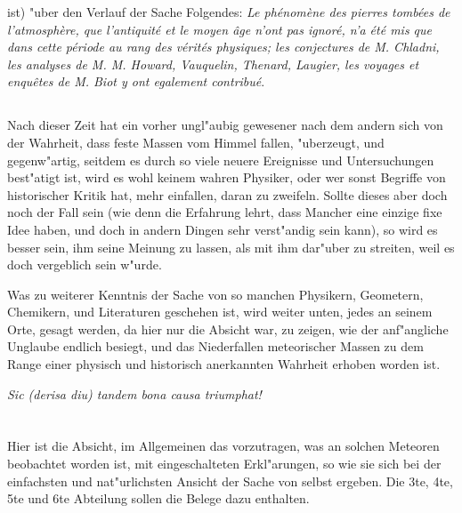 \documentclass[a4paper, 11pt, oneside, polutonikogreek, german]{article}
\begin{document}
ist) "uber den Verlauf der Sache Folgendes: \emph{Le phénomène des pierres tombées de l'atmosphère, que l'antiquité et le moyen âge n'ont pas ignoré, n'a été mis que dans cette période au rang des vérités physiques; les conjectures de M. Chladni, les analyses de M. M. Howard, Vauquelin, Thenard, Laugier, les voyages et enquêtes de M. Biot y ont egalement contribué}.
\subsection{}
\paragraph{}
Nach dieser Zeit hat ein vorher ungl"aubig gewesener nach dem andern sich von der Wahrheit, dass feste Massen vom Himmel fallen, "uberzeugt, und gegenw"artig, seitdem es durch so viele neuere Ereignisse und Untersuchungen best"atigt ist, wird es wohl keinem wahren Physiker, oder wer sonst Begriffe von historischer Kritik hat, mehr einfallen, daran zu zweifeln. Sollte dieses aber doch noch der Fall sein (wie denn die  Erfahrung lehrt, dass Mancher eine einzige fixe Idee haben, und doch in andern Dingen sehr verst"andig sein kann), so wird es besser sein, ihm seine Meinung zu lassen, als mit ihm dar"uber zu streiten, weil es doch vergeblich sein w"urde.

Was zu weiterer Kenntnis der Sache von so manchen Physikern, Geometern, Chemikern, und Literaturen geschehen ist, wird weiter unten, jedes an seinem Orte, gesagt werden, da hier nur die Absicht war, zu zeigen, wie der anf"angliche Unglaube endlich besiegt, und das Niederfallen meteorischer Massen zu dem Range einer physisch und historisch anerkannten Wahrheit erhoben worden ist.
\begin{center}
\emph{Sic (derisa diu) tandem bona causa triumphat!}  
\end{center}
\clearpage
\section{}
\subsection{}
\paragraph{}
Hier ist die Absicht, im Allgemeinen das vorzutragen, was an solchen Meteoren beobachtet worden ist, mit eingeschalteten Erkl"arungen, so wie sie sich bei der einfachsten und nat"urlichsten Ansicht der Sache von selbst ergeben. Die 3te, 4te, 5te und 6te Abteilung sollen die Belege dazu enthalten.
\end{document}

